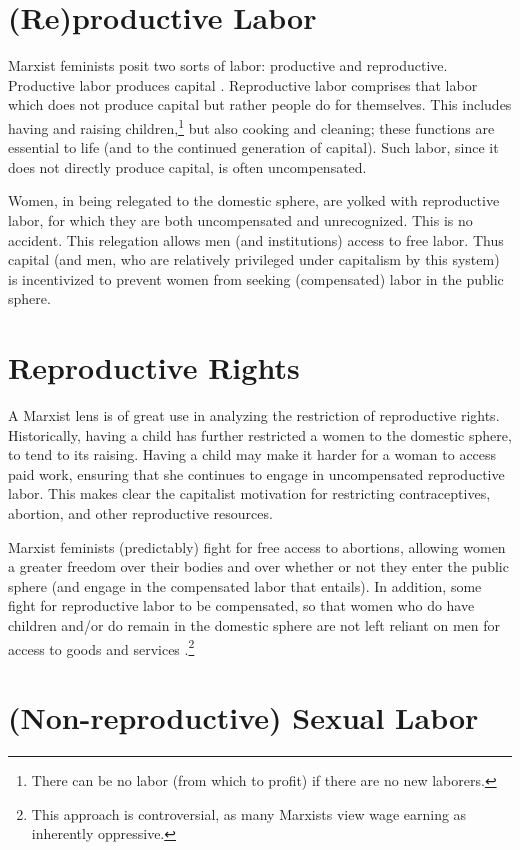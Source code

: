\documentclass[man,12pt,natbib]{apa6}
\begin{document}
\section{(Re)productive Labor}

Marxist feminists posit two sorts of labor: productive and reproductive.
Productive labor produces capital \citep{Vogel13}. Reproductive labor comprises
that labor which does not produce capital but rather people do for themselves.
This includes having and raising children,\footnote{There can be no labor (from
	which to profit) if there are no new laborers.} but also cooking and
cleaning; these functions are essential to life (and to the continued
generation of capital). Such labor, since it does not directly produce capital,
is often uncompensated.

Women, in being relegated to the domestic sphere, are yolked with reproductive
labor, for which they are both uncompensated and unrecognized. This is no
accident. This relegation allows men (and institutions) access to free labor.
Thus capital (and men, who are relatively privileged under capitalism by this
system) is incentivized to prevent women from seeking (compensated) labor in
the public sphere.

\section{Reproductive Rights}

A Marxist lens is of great use in analyzing the restriction of reproductive
rights. Historically, having a child has further restricted a women to the
domestic sphere, to tend to its raising. Having a child may make it harder for
a woman to access paid work, ensuring that she continues to engage in
uncompensated reproductive labor. This makes clear the capitalist motivation
for restricting contraceptives, abortion, and other reproductive resources.

Marxist feminists (predictably) fight for free access to abortions, allowing
women a greater freedom over their bodies and over whether or not they enter
the public sphere (and engage in the compensated labor that entails). In
addition, some fight for reproductive labor to be compensated, so that women
who do have children and/or do remain in the domestic sphere are not left
reliant on men for access to goods and services
\citep{Bromberg97}.\footnote{This approach is controversial, as many Marxists
	view wage earning as inherently oppressive.}

\section{(Non-reproductive) Sexual Labor}
\end{document}
